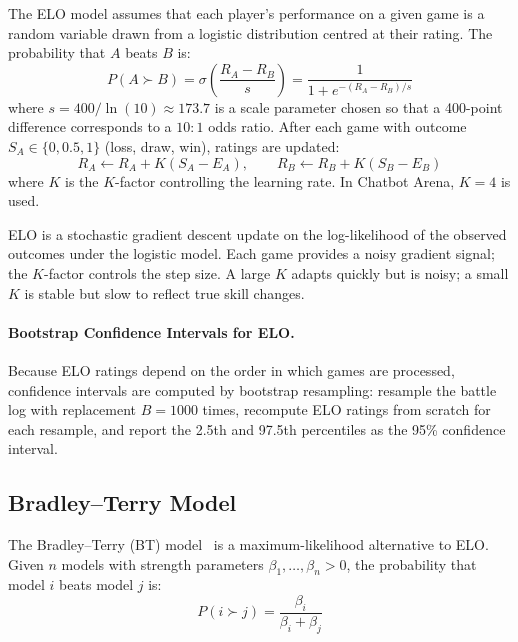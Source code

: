 The ELO model assumes that each player’s performance on a given game is a random variable drawn from a logistic distribution centred at their rating. The probability that $A$ beats $B$ is: 
\begin{equation}
    P(A \succ B) = \sigma\!\left(\frac{R_A - R_B}{s}\right) = \frac{1}{1 + e^{-(R_A - R_B)/s}}
\end{equation}
 where $s = 400/\ln(10) \approx 173.7$ is a scale parameter chosen so that a 400-point difference corresponds to a $10:1$ odds ratio. After each game with outcome $S_A \in \{0, 0.5, 1\}$ (loss, draw, win), ratings are updated: 
\begin{equation}
    R_A \leftarrow R_A + K(S_A - E_A), \qquad R_B \leftarrow R_B + K(S_B - E_B)
\end{equation}
 where $K$ is the $K$-factor controlling the learning rate. In Chatbot Arena, $K = 4$ is used.

\begin{intuitionbox}
ELO is a stochastic gradient descent update on the log-likelihood of the observed outcomes under the logistic model. Each game provides a noisy gradient signal; the $K$-factor controls the step size. A large $K$ adapts quickly but is noisy; a small $K$ is stable but slow to reflect true skill changes.
\end{intuitionbox}

\paragraph{Bootstrap Confidence Intervals for ELO.}
\label{bootstrap-confidence-intervals-for-elo.}

Because ELO ratings depend on the order in which games are processed, confidence intervals are computed by bootstrap resampling: resample the battle log with replacement $B = 1000$ times, recompute ELO ratings from scratch for each resample, and report the 2.5th and 97.5th percentiles as the 95\% confidence interval.

\subsection{Bradley--Terry Model}
\label{bradleyterry-model}

The Bradley--Terry (BT) model~\cite{bradley1952rank} is a maximum-likelihood alternative to ELO. Given $n$ models with strength parameters $\beta_1, \ldots, \beta_n > 0$, the probability that model $i$ beats model $j$ is: 
\begin{equation}
    P(i \succ j) = \frac{\beta_i}{\beta_i + \beta_j}
\end{equation}

